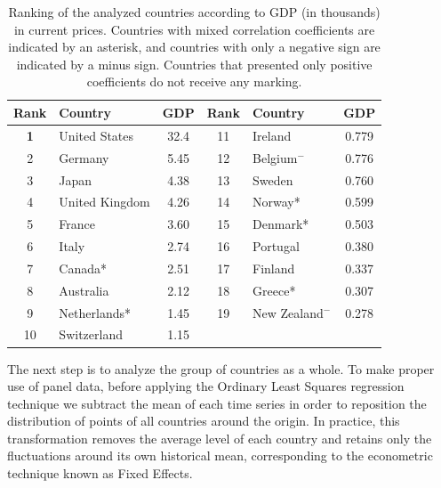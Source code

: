 \documentclass[12pt]{article}
\begin{document}
\begin{table}[]
\centering
\begin{tabular}{clcclc}
Rank                   & Country        & \multicolumn{1}{c|}{GDP}  & Rank                 & Country         & GDP   \\ \hline
\textbf{1}             & United States  & \multicolumn{1}{c|}{32.4} & 11                   & Ireland         & 0.779 \\
2                      & Germany        & \multicolumn{1}{c|}{5.45} & 12                   & Belgium$^-$& 0.776 \\
3                      & Japan          & \multicolumn{1}{c|}{4.38} & 13                   & Sweden          & 0.760 \\
4                      & United Kingdom & \multicolumn{1}{c|}{4.26} & 14                   & Norway*         & 0.599 \\
5                      & France         & \multicolumn{1}{c|}{3.60} & 15                   & Denmark*        & 0.503 \\
6                      & Italy          & \multicolumn{1}{c|}{2.74} & 16                   & Portugal        & 0.380 \\
7                      & Canada*        & \multicolumn{1}{c|}{2.51} & 17                   & Finland         & 0.337 \\
8                      & Australia      & \multicolumn{1}{c|}{2.12} & 18                   & Greece*         & 0.307 \\
9                      & Netherlands*   & \multicolumn{1}{c|}{1.45} & 19                   & New Zealand$^-$& 0.278 \\
10                     & Switzerland    & \multicolumn{1}{c|}{1.15} & \multicolumn{1}{l}{} &                 &      
\end{tabular}
\caption{Ranking of the analyzed countries according to GDP (in thousands) in current prices. Countries with mixed correlation coefficients are indicated by an asterisk, and countries with only a negative sign are indicated by a minus sign. Countries that presented only positive coefficients do not receive any marking. }
\label{table:all}
\end{table}

The next step is to analyze the group of countries as a whole. To make proper use of panel data, before applying the Ordinary Least Squares regression technique we subtract the mean of each time series in order to reposition the distribution of points of all countries around the origin. In practice, this transformation removes the average level of each country and retains only the fluctuations around its own historical mean, corresponding to the econometric technique known as Fixed Effects.
\end{document}
